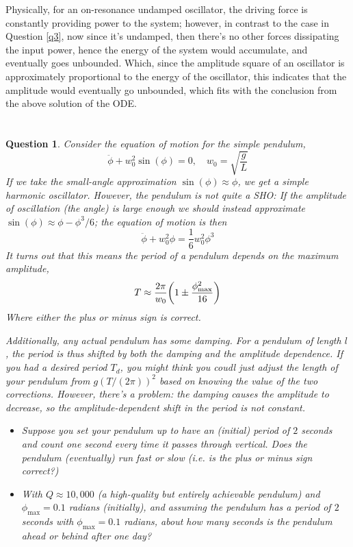 \documentclass{article}
\newtheorem{question}{Question}
\DeclarePairedDelimiter{\paran}{(}{)}%
\begin{document}
Physically, for an on-resonance undamped oscillator, the driving force is constantly providing power to the system; however, in contrast to the case in Question \ref{q3}, now since it's undamped, then there's no other forces dissipating the input power, hence the energy of the system would accumulate, and eventually goes unbounded. Which, since the amplitude square of an oscillator is approximately proportional to the energy of the oscillator, this indicates that the amplitude would eventually go unbounded, which fits with the conclusion from the above solution of the ODE.

\break

\section{}
\begin{question}\label{q6}
    Consider the equation of motion for the simple pendulum,
    $$\ddot \phi+w_0^2\sin(\phi)=0,\quad w_0=\sqrt{\frac{g}{L}}$$
    If we take the small-angle approximation $\sin(\phi)\approx\phi$, we get a simple harmonic oscillator. However, the pendulum is not quite a SHO: If the amplitude of oscillation (the angle) is large enough we should instead approximate $\sin(\phi)\approx \phi-\phi^3/6$; the equation of motion is then 
    $$\ddot\phi+w_0^2\phi=\frac{1}{6}w_0^2\phi^3$$
    It turns out that this means the period of a pendulum depends on the maximum amplitude,
    $$T\approx\frac{2\pi}{w_0}\paran*{1\pm\frac{\phi^2_{\max}}{16}}$$
    Where either the plus or minus sign is correct.
    
    Additionally, any actual pendulum has some damping. For a pendulum of length $l$, the period is thus shifted by both the damping and the amplitude dependence. If you had a desired period $T_d$, you might think you coudl just adjust the length of your pendulum from $g(T/(2\pi))^2$ based on knowing the value of the two corrections. However, there's a problem: the damping causes the amplitude to decrease, so the amplitude-dependent shift in the period is not constant.
    \begin{itemize}
        \item[(a)] Suppose you set your pendulum up to have an (initial) period of $2$ seconds and count one second every time it passes through vertical. Does the pendulum (eventually) run fast or slow (i.e. is the plus or minus sign correct?) 
        \item[(b)] With $Q\approx 10,000$ (a high-quality but entirely achievable pendulum) and $\phi_{\max}=0.1$ radians (initially), and assuming the pendulum has a period of $2$ seconds with $\phi_{\max}=0.1$ radians, about how many seconds is the pendulum ahead or behind after one day? 
    \end{itemize}
\end{question}
\end{document}
